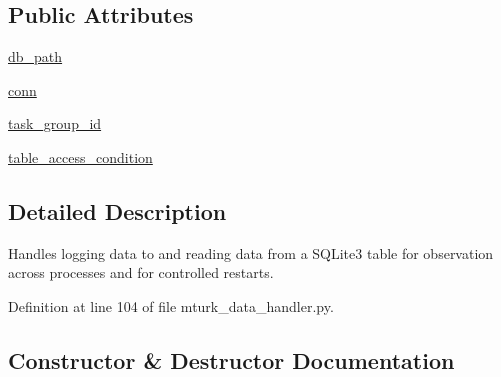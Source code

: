 \subsection*{Public Attributes}
\begin{DoxyCompactItemize}
\item 
\hyperlink{classparlai_1_1mturk_1_1core_1_1dev_1_1mturk__data__handler_1_1MTurkDataHandler_a7cca153268ab042892a68ad4aa032414}{db\+\_\+path}
\item 
\hyperlink{classparlai_1_1mturk_1_1core_1_1dev_1_1mturk__data__handler_1_1MTurkDataHandler_a66361d334cabae5782ca8a8740b32e95}{conn}
\item 
\hyperlink{classparlai_1_1mturk_1_1core_1_1dev_1_1mturk__data__handler_1_1MTurkDataHandler_af4bebaca067ce2d388fe76ee8859e1bd}{task\+\_\+group\+\_\+id}
\item 
\hyperlink{classparlai_1_1mturk_1_1core_1_1dev_1_1mturk__data__handler_1_1MTurkDataHandler_a782fb3d819b27356b34060bc3b9f110e}{table\+\_\+access\+\_\+condition}
\end{DoxyCompactItemize}


\subsection{Detailed Description}
\begin{DoxyVerb}Handles logging data to and reading data from a SQLite3 table for observation across
processes and for controlled restarts.
\end{DoxyVerb}
 

Definition at line 104 of file mturk\+\_\+data\+\_\+handler.\+py.



\subsection{Constructor \& Destructor Documentation}
\mbox{\label{classparlai_1_1mturk_1_1core_1_1dev_1_1mturk__data__handler_1_1MTurkDataHandler_ac6706c58fc7fc4f76a8d92e55c4d64df}} 
